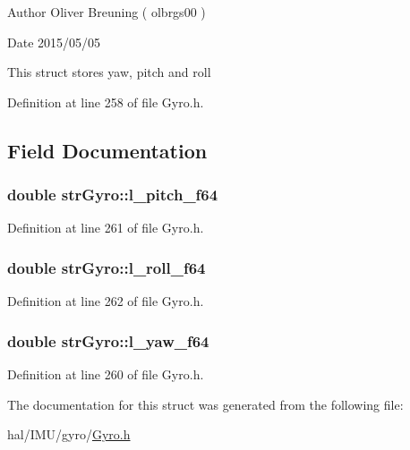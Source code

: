  \begin{DoxyAuthor}{Author}
Oliver Breuning ( olbrgs00 ) 
\end{DoxyAuthor}
\begin{DoxyDate}{Date}
2015/05/05
\end{DoxyDate}
This struct stores yaw, pitch and roll

Definition at line 258 of file Gyro.\+h.



\subsection{Field Documentation}
\hypertarget{structstrGyro_a9d82fa8970135f2097dd209a74138848_a9d82fa8970135f2097dd209a74138848}{
\subsubsection[{l\+\_\+pitch\+\_\+f64}]{\setlength{\rightskip}{0pt plus 5cm}double str\+Gyro\+::l\+\_\+pitch\+\_\+f64}}\label{structstrGyro_a9d82fa8970135f2097dd209a74138848_a9d82fa8970135f2097dd209a74138848}


Definition at line 261 of file Gyro.\+h.

\hypertarget{structstrGyro_a0b8d0c0ec6e3324a403d983d67fae643_a0b8d0c0ec6e3324a403d983d67fae643}{
\subsubsection[{l\+\_\+roll\+\_\+f64}]{\setlength{\rightskip}{0pt plus 5cm}double str\+Gyro\+::l\+\_\+roll\+\_\+f64}}\label{structstrGyro_a0b8d0c0ec6e3324a403d983d67fae643_a0b8d0c0ec6e3324a403d983d67fae643}


Definition at line 262 of file Gyro.\+h.

\hypertarget{structstrGyro_a1c8ca43d350ad8ef20d2968aa29e6ce6_a1c8ca43d350ad8ef20d2968aa29e6ce6}{
\subsubsection[{l\+\_\+yaw\+\_\+f64}]{\setlength{\rightskip}{0pt plus 5cm}double str\+Gyro\+::l\+\_\+yaw\+\_\+f64}}\label{structstrGyro_a1c8ca43d350ad8ef20d2968aa29e6ce6_a1c8ca43d350ad8ef20d2968aa29e6ce6}


Definition at line 260 of file Gyro.\+h.



The documentation for this struct was generated from the following file\+:\begin{DoxyCompactItemize}
\item 
hal/\+I\+M\+U/gyro/\hyperlink{Gyro_8h}{Gyro.\+h}\end{DoxyCompactItemize}
